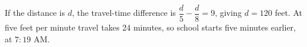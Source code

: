 If the distance is $d$, the travel-time difference is $\dfrac{d}{5}-\dfrac{d}{8}=9$, giving $d=120$ feet. At five feet per minute travel takes 24 minutes, so school starts five minutes earlier, at $\boxed{7{:}19\text{ AM}}$.
